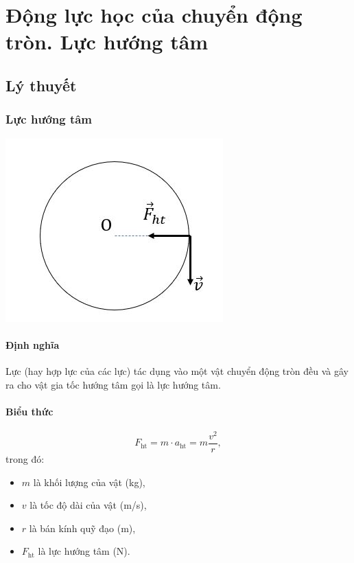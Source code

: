 \let\lesson\undefined
\newcommand{\lesson}{\phantomlesson{Bài 21: Động lực học của chuyển động tròn. Lực hướng tâm}}
\chapter[Động lực học của chuyển động tròn. Lực hướng tâm]{Động lực học của chuyển động tròn. Lực hướng tâm}
\setcounter{section}{0}
\section{Lý thuyết}
\subsection{Lực hướng tâm}
\begin{center}
	\includegraphics[scale=0.6]{../figs/VN10-PH-16-L-013-1-V2-04.JPG}
\end{center}
\subsubsection{Định nghĩa}
Lực (hay hợp lực của các lực) tác dụng vào một vật chuyển động tròn đều và gây ra cho vật gia tốc hướng tâm gọi là lực hướng tâm.
\subsubsection{Biểu thức}

\begin{equation*}
	F_{\text{ht}} = m \cdot a_{\text{ht}} = m\dfrac{v^2}{r},
\end{equation*}
trong đó:
\begin{itemize}
	\item $m$ là khối lượng của vật (kg), 
	\item $v$ là tốc độ dài của vật (m/s),
	\item $r$ là bán kính quỹ đạo (m),
	\item $F_{\text{ht}}$ là lực hướng tâm (N).
\end{itemize}
